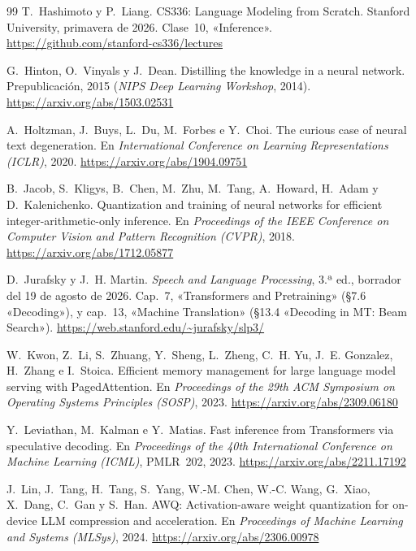 \begin{thebibliography}{99}
T.~Hashimoto y P.~Liang.
\newblock CS336: Language Modeling from Scratch.
\newblock Stanford University, primavera de 2026. Clase~10, «Inference».
\newblock \url{https://github.com/stanford-cs336/lectures}

G.~Hinton, O.~Vinyals y J.~Dean.
\newblock Distilling the knowledge in a neural network.
\newblock Prepublicación, 2015 (\emph{NIPS Deep Learning Workshop}, 2014).
\newblock \url{https://arxiv.org/abs/1503.02531}

A.~Holtzman, J.~Buys, L.~Du, M.~Forbes e Y.~Choi.
\newblock The curious case of neural text degeneration.
\newblock En \emph{International Conference on Learning Representations (ICLR)}, 2020.
\newblock \url{https://arxiv.org/abs/1904.09751}

B.~Jacob, S.~Kligys, B.~Chen, M.~Zhu, M.~Tang, A.~Howard, H.~Adam y D.~Kalenichenko.
\newblock Quantization and training of neural networks for efficient integer-arithmetic-only inference.
\newblock En \emph{Proceedings of the IEEE Conference on Computer Vision and Pattern Recognition (CVPR)}, 2018.
\newblock \url{https://arxiv.org/abs/1712.05877}

D.~Jurafsky y J.~H. Martin.
\newblock \emph{Speech and Language Processing}, 3.ª ed., borrador del 19 de agosto de 2026.
\newblock Cap.~7, «Transformers and Pretraining» (§7.6 «Decoding»), y cap.~13, «Machine Translation» (§13.4 «Decoding in MT: Beam Search»).
\newblock \url{https://web.stanford.edu/~jurafsky/slp3/}

W.~Kwon, Z.~Li, S.~Zhuang, Y.~Sheng, L.~Zheng, C.~H. Yu, J.~E. Gonzalez, H.~Zhang e I.~Stoica.
\newblock Efficient memory management for large language model serving with PagedAttention.
\newblock En \emph{Proceedings of the 29th ACM Symposium on Operating Systems Principles (SOSP)}, 2023.
\newblock \url{https://arxiv.org/abs/2309.06180}

Y.~Leviathan, M.~Kalman e Y.~Matias.
\newblock Fast inference from Transformers via speculative decoding.
\newblock En \emph{Proceedings of the 40th International Conference on Machine Learning (ICML)}, PMLR~202, 2023.
\newblock \url{https://arxiv.org/abs/2211.17192}

J.~Lin, J.~Tang, H.~Tang, S.~Yang, W.-M. Chen, W.-C. Wang, G.~Xiao, X.~Dang, C.~Gan y S.~Han.
\newblock AWQ: Activation-aware weight quantization for on-device LLM compression and acceleration.
\newblock En \emph{Proceedings of Machine Learning and Systems (MLSys)}, 2024.
\newblock \url{https://arxiv.org/abs/2306.00978}


\end{thebibliography}

